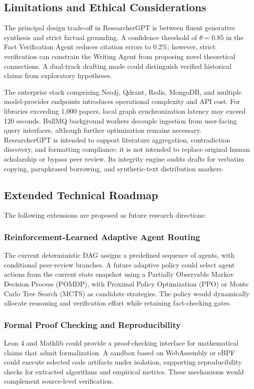 \documentclass[conference]{IEEEtran}
\begin{document}
\subsection{Limitations and Ethical Considerations}
The principal design trade-off in ResearcherGPT is between fluent generative synthesis and strict factual grounding. A confidence threshold of $\theta = 0.85$ in the Fact Verification Agent reduces citation errors to 0.2\%; however, strict verification can constrain the Writing Agent from proposing novel theoretical connections. A dual-track drafting mode could distinguish verified historical claims from exploratory hypotheses.

The enterprise stack comprising Neo4j, Qdrant, Redis, MongoDB, and multiple model-provider endpoints introduces operational complexity and API cost. For libraries exceeding 1,000 papers, local graph synchronization latency may exceed 120 seconds. BullMQ background workers decouple ingestion from user-facing query interfaces, although further optimization remains necessary. ResearcherGPT is intended to support literature aggregation, contradiction discovery, and formatting compliance; it is not intended to replace original human scholarship or bypass peer review. Its integrity engine audits drafts for verbatim copying, paraphrased borrowing, and synthetic-text distribution markers.

\subsection{Extended Technical Roadmap}
The following extensions are proposed as future research directions:
\subsubsection{Reinforcement-Learned Adaptive Agent Routing}
The current deterministic DAG assigns a predefined sequence of agents, with conditional peer-review branches. A future adaptive policy could select agent actions from the current state snapshot using a Partially Observable Markov Decision Process (POMDP), with Proximal Policy Optimization (PPO) or Monte Carlo Tree Search (MCTS) as candidate strategies. The policy would dynamically allocate reasoning and verification effort while retaining fact-checking gates.

\subsubsection{Formal Proof Checking and Reproducibility}
Lean 4 and Mathlib could provide a proof-checking interface for mathematical claims that admit formalization. A sandbox based on WebAssembly or eBPF could execute selected code artifacts under isolation, supporting reproducibility checks for extracted algorithms and empirical metrics. These mechanisms would complement source-level verification.
\end{document}
